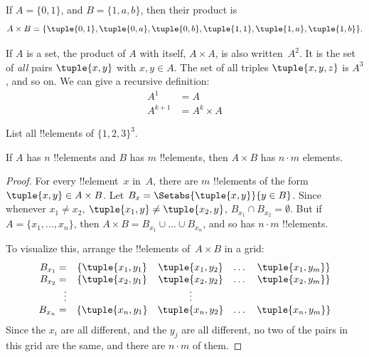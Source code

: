 \documentclass[../../../include/open-logic-section]{subfiles}
\begin{document}
\begin{ex}
If $A = \{0, 1\}$, and $B = \{1, a, b\}$, then their product is
\[
A \times B = \{ \tuple{0, 1}, \tuple{0, a}, \tuple{0, b},
    \tuple{1, 1}, \tuple{1, a}, \tuple{1, b} \}.
\]
\end{ex}

\begin{ex}
If $A$ is a set, the product of $A$ with itself, $A \times A$, is also
written~$A^2$. It is the set of \emph{all} pairs $\tuple{x, y}$ with
$x, y \in A$. The set of all triples $\tuple{x, y, z}$ is $A^3$, and
so on. We can give a recursive definition:
\begin{align*}
  A^1 & = A\\
  A^{k+1} & = A^k \times A
\end{align*}
\end{ex}

\begin{prob}
List all !!{element}s of $\{1, 2, 3\}^3$.
\end{prob}

\begin{prop}
If $A$ has $n$ !!{element}s and $B$ has $m$ !!{element}s, then $A
\times B$ has $n\cdot m$ elements.
\end{prop}

\begin{proof}
For every !!{element}~$x$ in~$A$, there are $m$ !!{element}s of the
form $\tuple{x, y} \in A \times B$. Let $B_x = \Setabs{\tuple{x, y}}{y
  \in B}$. Since whenever $x_1 \neq x_2$, $\tuple{x_1, y} \neq
\tuple{x_2, y}$, $B_{x_1} \cap B_{x_2} = \emptyset$. But if $A = \{x_1,
\dots, x_n\}$, then $A \times B = B_{x_1} \cup \dots \cup B_{x_n}$, and so has
$n\cdot m$ !!{element}s.

To visualize this, arrange the !!{element}s of~$A \times B$ in a grid:
\[
\begin{array}{rcccc}
  B_{x_1} = & \{\tuple{x_1, y_1} & \tuple{x_1, y_2} & \dots & \tuple{x_1, y_m}\}\\
  B_{x_2} = & \{\tuple{x_2, y_1} & \tuple{x_2, y_2} & \dots & \tuple{x_2, y_m}\}\\
  \vdots & & \vdots\\
  B_{x_n} = & \{\tuple{x_n, y_1} & \tuple{x_n, y_2} & \dots & \tuple{x_n, y_m}\}
\end{array}
\]
Since the $x_i$ are all different, and the $y_j$ are all different, no
two of the pairs in this grid are the same, and there are $n\cdot m$
of them.
\end{proof}
\end{document}
